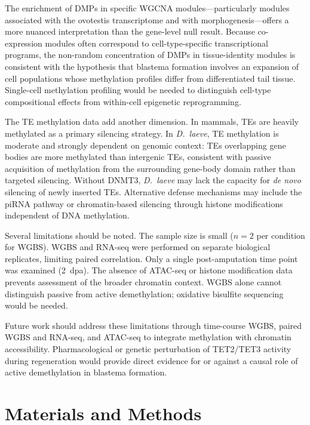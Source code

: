 \documentclass[12pt]{article}
\begin{document}
The enrichment of DMPs in specific WGCNA modules---particularly modules associated with the ovotestis transcriptome and with morphogenesis---offers a more nuanced interpretation than the gene-level null result. Because co-expression modules often correspond to cell-type-specific transcriptional programs, the non-random concentration of DMPs in tissue-identity modules is consistent with the hypothesis that blastema formation involves an expansion of cell populations whose methylation profiles differ from differentiated tail tissue. Single-cell methylation profiling would be needed to distinguish cell-type compositional effects from within-cell epigenetic reprogramming.

The TE methylation data add another dimension. In mammals, TEs are heavily methylated as a primary silencing strategy. In \textit{D.\ laeve}, TE methylation is moderate and strongly dependent on genomic context: TEs overlapping gene bodies are more methylated than intergenic TEs, consistent with passive acquisition of methylation from the surrounding gene-body domain rather than targeted silencing. Without DNMT3, \textit{D.\ laeve} may lack the capacity for \textit{de novo} silencing of newly inserted TEs. Alternative defense mechanisms may include the piRNA pathway or chromatin-based silencing through histone modifications independent of DNA methylation.

Several limitations should be noted. The sample size is small ($n = 2$ per condition for WGBS). WGBS and RNA-seq were performed on separate biological replicates, limiting paired correlation. Only a single post-amputation time point was examined (2~dpa). The absence of ATAC-seq or histone modification data prevents assessment of the broader chromatin context. WGBS alone cannot distinguish passive from active demethylation; oxidative bisulfite sequencing would be needed.

Future work should address these limitations through time-course WGBS, paired WGBS and RNA-seq, and ATAC-seq to integrate methylation with chromatin accessibility. Pharmacological or genetic perturbation of TET2/TET3 activity during regeneration would provide direct evidence for or against a causal role of active demethylation in blastema formation.



\section*{Materials and Methods}
\end{document}
